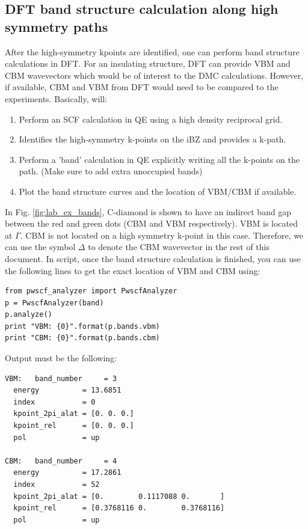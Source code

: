 \subsection{DFT band structure calculation along high symmetry paths}
After the high-symmetry kpoints are identified, one can perform band structure calculations in DFT. 
For an insulating structure, DFT can provide VBM and CBM wavevectors which would be of interest to the DMC calculations. 
However, if available, CBM and VBM from DFT would need to be compared to the experiments.  
Basically,   will:
\begin{enumerate}
	\item Perform an SCF calculation in QE using a high density reciprocal grid.
	\item Identifies the high-symmetry k-points on the iBZ and provides a k-path.
	\item Perform a 'band' calculation in QE explicitly writing all the k-points on the path. (Make sure to add extra unoccupied bands)
	\item Plot the band structure curves and the location of VBM/CBM if available.
\end{enumerate}
In Fig. \ref{fig:lab_ex_bands}, C-diamond is shown to have an indirect band gap between the red and green dots (CBM and VBM respectively). 
VBM is located at $\Gamma$. CBM is not located on a high symmetry k-point in this case. 
Therefore, we can use the symbol $\Delta$ to denote the CBM wavevector in the rest of this document. 
In  script, once the band structure calculation is finished, you can use the following lines to get the exact location of VBM and CBM using:
\begin{lstlisting}[style=Python]
from pwscf_analyzer import PwscfAnalyzer
p = PwscfAnalyzer(band)
p.analyze()
print "VBM: {0}".format(p.bands.vbm)
print "CBM: {0}".format(p.bands.cbm)
\end{lstlisting}
Output must be the following:
\begin{lstlisting}[style=Python]
VBM:   band_number     = 3
  energy          = 13.6851
  index           = 0
  kpoint_2pi_alat = [0. 0. 0.]
  kpoint_rel      = [0. 0. 0.]
  pol             = up

CBM:   band_number     = 4
  energy          = 17.2861
  index           = 52
  kpoint_2pi_alat = [0.        0.1117088 0.       ]
  kpoint_rel      = [0.3768116 0.        0.3768116]
  pol             = up
\end{lstlisting}
